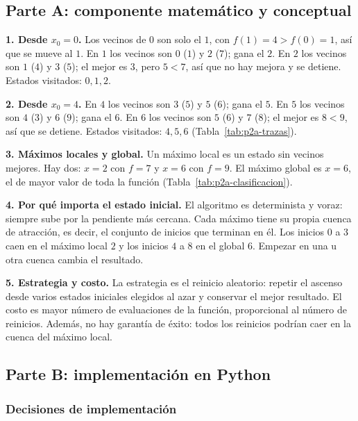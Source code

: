 \documentclass[12pt,a4paper]{article}
\begin{document}
\subsection{Parte A: componente matemático y conceptual}

\noindent\textbf{1. Desde $x_0=0$.} Los vecinos de $0$ son solo el $1$, con
$f(1)=4>f(0)=1$, así que se mueve al $1$. En $1$ los vecinos son $0$ ($1$) y
$2$ ($7$); gana el $2$. En $2$ los vecinos son $1$ ($4$) y $3$ ($5$); el
mejor es $3$, pero $5<7$, así que no hay mejora y se detiene. Estados
visitados: $0,1,2$.

\noindent\textbf{2. Desde $x_0=4$.} En $4$ los vecinos son $3$ ($5$) y $5$
($6$); gana el $5$. En $5$ los vecinos son $4$ ($3$) y $6$ ($9$); gana el $6$.
En $6$ los vecinos son $5$ ($6$) y $7$ ($8$); el mejor es $8<9$, así que se
detiene. Estados visitados: $4,5,6$ (Tabla~\ref{tab:p2a-trazas}).



\noindent\textbf{3. Máximos locales y global.} Un máximo local es un estado
sin vecinos mejores. Hay dos: $x=2$ con $f=7$ y $x=6$ con $f=9$. El máximo
global es $x=6$, el de mayor valor de toda la función
(Tabla~\ref{tab:p2a-clasificacion}).



\noindent\textbf{4. Por qué importa el estado inicial.} El algoritmo es
determinista y voraz: siempre sube por la pendiente más cercana. Cada máximo
tiene su propia cuenca de atracción, es decir, el conjunto de inicios que
terminan en él. Los inicios $0$ a $3$ caen en el máximo local $2$ y los
inicios $4$ a $8$ en el global $6$. Empezar en una u otra cuenca cambia el
resultado.

\noindent\textbf{5. Estrategia y costo.} La estrategia es el reinicio
aleatorio: repetir el ascenso desde varios estados iniciales elegidos al azar
y conservar el mejor resultado. El costo es mayor número de evaluaciones de
la función, proporcional al número de reinicios. Además, no hay garantía de
éxito: todos los reinicios podrían caer en la cuenca del máximo local.

\subsection{Parte B: implementación en Python}

\subsubsection{Decisiones de implementación}
\end{document}
